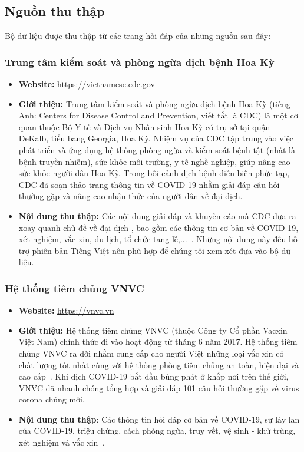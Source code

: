 \documentclass[runningheads]{llncs}
\begin{document}
\subsection{Nguồn thu thập}
Bộ dữ liệu được thu thập từ các trang hỏi đáp của những nguồn sau đây:

\subsubsection{Trung tâm kiểm soát và phòng ngừa dịch bệnh Hoa Kỳ}
\begin{itemize}
\item \textbf{Website:} \url{https://vietnamese.cdc.gov}
\item \textbf{Giới thiệu:}
Trung tâm kiểm soát và phòng ngừa dịch bệnh Hoa Kỳ (tiếng Anh: Centers for Disease Control and Prevention, viết tắt là CDC) là một cơ quan thuộc Bộ Y tế và Dịch vụ Nhân sinh Hoa Kỳ có trụ sở tại quận DeKalb, tiểu bang Georgia, Hoa Kỳ. Nhiệm vụ của CDC tập trung vào việc phát triển và ứng dụng hệ thống phòng ngừa và kiểm soát bệnh tật (nhất là bệnh truyền nhiễm), sức khỏe môi trường, y tế nghề nghiệp, giúp nâng cao sức khỏe người dân Hoa Kỳ. Trong bối cảnh dịch bệnh diễn biến phức tạp, CDC đã soạn thảo trang thông tin về COVID-19 nhằm giải đáp câu hỏi thường gặp và nâng cao nhận thức của người dân về đại dịch. 

\item \textbf{Nội dung thu thập:} Các nội dung giải đáp và khuyến cáo mà CDC đưa ra xoay quanh chủ đề về đại dịch , bao gồm các thông tin cơ bản về COVID-19, xét nghiệm, vắc xin, du lịch, tổ chức tang lễ,...~\cite{ref_url7}. Những nội dung này đều hỗ trợ phiên bản Tiếng Việt nên phù hợp để chúng tôi xem xét đưa vào bộ dữ liệu.
\end{itemize}


\subsubsection{Hệ thống tiêm chủng VNVC}
\begin{itemize}
\item \textbf{Website:} \url{https://vnvc.vn}
\item \textbf{Giới thiệu:}
Hệ thống tiêm chủng VNVC (thuộc Công ty Cổ phần Vacxin Việt Nam) chính thức đi vào hoạt động từ tháng 6 năm 2017. Hệ thống tiêm chủng VNVC ra đời nhằm cung cấp cho người Việt những loại vắc xin có chất lượng tốt nhất cùng với hệ thống phòng tiêm chủng an toàn, hiện đại và cao cấp~\cite{ref_url2}. Khi dịch COVID-19 bắt đầu bùng phát ở khắp nơi trên thế giới, VNVC đã nhanh chóng tổng hợp và giải đáp 101 câu hỏi thường gặp về virus corona chủng mới.

\item \textbf{Nội dung thu thập}: Các thông tin hỏi đáp cơ bản về COVID-19, sự lây lan của COVID-19, triệu chứng, cách phòng ngừa, truy vết, vệ sinh - khử trùng, xét nghiệm và vắc xin~\cite{ref_url8}.

\end{itemize}
\end{document}
